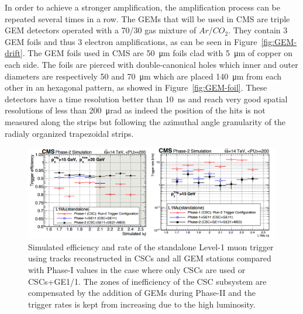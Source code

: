 	In order to achieve a stronger amplification, the amplification process can be repeated several times in a row. The GEMs that will be used in CMS are triple GEM detectors operated with a 70/30 gas mixture of $Ar$/$CO_2$. They contain 3 GEM foils and thus 3 electron amplifications, as can be seen in Figure~\ref{fig:GEM-drift}. The GEM foils used in CMS are \SI{50}{\micro m} foils clad with \SI{5}{\micro m} of copper on each side. The foils are pierced with double-canonical holes which inner and outer diameters are respectively 50 and \SI{70}{\micro m} which are placed \SI{140}{\micro m} from each other in an hexagonal pattern, as showed in Figure~\ref{fig:GEM-foil}. These detectors have a time resolution better than \SI{10}{ns} and reach very good spatial resolutions of less than \SI{200}{\micro rad} as indeed the position of the hits is not measured along the strips but following the azimuthal angle granularity of the radialy organized trapezoidal strips.

	\begin{figure}[H]
		\centering
		\includegraphics[width=\linewidth]{fig/chapt3/GEM-Trigger.png}
		\caption{\label{fig:GEM-Trigger} Simulated efficiency and rate of the standalone Level-1 muon trigger using tracks reconstructed in CSCs and all GEM stations compared with Phase-I values in the case where only CSCs are used or CSCs+GE1/1. The zones of inefficiency of the CSC subsystem are compensated by the addition of GEMs during Phase-II and the trigger rates is kept from increasing due to the high luminosity.}
	\end{figure}
	
